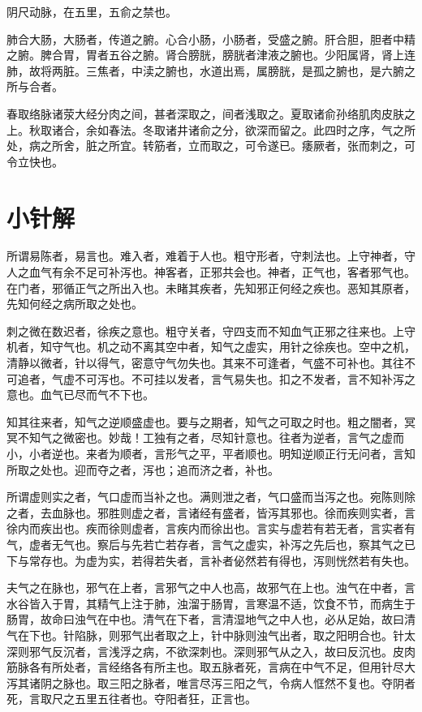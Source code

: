 \documentclass[a4paper,12pt,UTF8,twoside]{ctexbook}
\begin{document}
	阴尺动脉，在五里，五俞之禁也。
	
	肺合大肠，大肠者，传道之腑。心合小肠，小肠者，受盛之腑。肝合胆，胆者中精之腑。脾合胃，胃者五谷之腑。肾合膀胱，膀胱者津液之腑也。少阳属肾，肾上连肺，故将两脏。三焦者，中渎之腑也，水道出焉，属膀胱，是孤之腑也，是六腑之所与合者。
	
	春取络脉诸荥大经分肉之间，甚者深取之，间者浅取之。夏取诸俞孙络肌肉皮肤之上。秋取诸合，余如春法。冬取诸井诸俞之分，欲深而留之。此四时之序，气之所处，病之所舍，脏之所宜。转筋者，立而取之，可令遂已。痿厥者，张而刺之，可令立快也。
	\chapter{小针解}
	
	所谓易陈者，易言也。难入者，难着于人也。粗守形者，守刺法也。上守神者，守人之血气有余不足可补泻也。神客者，正邪共会也。神者，正气也，客者邪气也。在门者，邪循正气之所出入也。未睹其疾者，先知邪正何经之疾也。恶知其原者，先知何经之病所取之处也。
	
	刺之微在数迟者，徐疾之意也。粗守关者，守四支而不知血气正邪之往来也。上守机者，知守气也。机之动不离其空中者，知气之虚实，用针之徐疾也。空中之机，清静以微者，针以得气，密意守气勿失也。其来不可逢者，气盛不可补也。其往不可追者，气虚不可泻也。不可挂以发者，言气易失也。扣之不发者，言不知补泻之意也。血气已尽而气不下也。
	
	知其往来者，知气之逆顺盛虚也。要与之期者，知气之可取之时也。粗之闇者，冥冥不知气之微密也。妙哉！工独有之者，尽知针意也。往者为逆者，言气之虚而小，小者逆也。来者为顺者，言形气之平，平者顺也。明知逆顺正行无问者，言知所取之处也。迎而夺之者，泻也；追而济之者，补也。
	
	所谓虚则实之者，气口虚而当补之也。满则泄之者，气口盛而当泻之也。宛陈则除之者，去血脉也。邪胜则虚之者，言诸经有盛者，皆泻其邪也。徐而疾则实者，言徐内而疾出也。疾而徐则虚者，言疾内而徐出也。言实与虚若有若无者，言实者有气，虚者无气也。察后与先若亡若存者，言气之虚实，补泻之先后也，察其气之已下与常存也。为虚为实，若得若失者，言补者佖然若有得也，泻则恍然若有失也。
	
	夫气之在脉也，邪气在上者，言邪气之中人也高，故邪气在上也。浊气在中者，言水谷皆入于胃，其精气上注于肺，浊溜于肠胃，言寒温不适，饮食不节，而病生于肠胃，故命曰浊气在中也。清气在下者，言清湿地气之中人也，必从足始，故曰清气在下也。针陷脉，则邪气出者取之上，针中脉则浊气出者，取之阳明合也。针太深则邪气反沉者，言浅浮之病，不欲深刺也。深则邪气从之入，故曰反沉也。皮肉筋脉各有所处者，言经络各有所主也。取五脉者死，言病在中气不足，但用针尽大泻其诸阴之脉也。取三阳之脉者，唯言尽泻三阳之气，令病人恇然不复也。夺阴者死，言取尺之五里五往者也。夺阳者狂，正言也。
	
\end{document}
